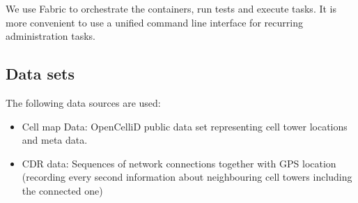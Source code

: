We use Fabric to orchestrate the containers, run tests and execute tasks. It is more convenient to use a unified command line interface for recurring administration tasks. \cite{fabric}

\subsection{Data sets}
The following data sources are used:
\begin{itemize}
\item Cell map Data: OpenCelliD public data set representing cell tower locations and meta data.
\item CDR data: Sequences of network connections together with GPS location (recording every second information about neighbouring cell towers including the connected one)
\end{itemize}

